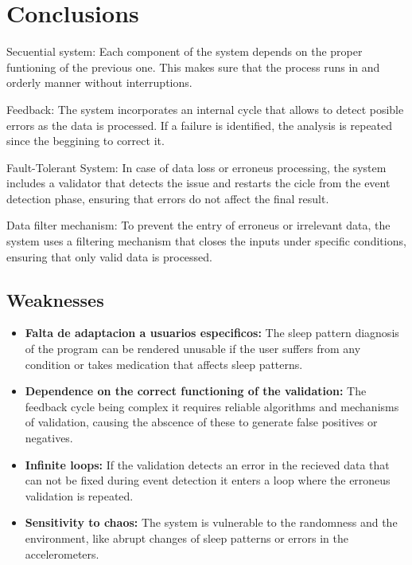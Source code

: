 \documentclass[conference]{IEEEtran}
\begin{document}
\section{Conclusions}

Secuential system:
Each component of the system depends on the proper funtioning of the previous one. This makes sure that the process runs in and orderly manner without interruptions.

Feedback:
The system incorporates an internal cycle that allows to detect posible errors as the data is processed. If a failure is identified, the analysis is repeated since the beggining to correct it.

Fault-Tolerant System:
In case of data loss or erroneus processing, the system includes a validator that detects the issue and restarts the cicle from the event detection phase, ensuring that errors do not affect the final result.

Data filter mechanism:
To prevent the entry of erroneus or irrelevant data, the system uses a filtering mechanism that closes the inputs under specific conditions, ensuring that only valid data is processed.

\subsection{Weaknesses}

\begin{itemize}
    \item \textbf{Falta de adaptacion a usuarios especificos:} The sleep pattern diagnosis of the program can be rendered unusable if the user suffers from any condition or takes medication that affects sleep patterns.
    \item \textbf{Dependence on the correct functioning of the validation:} The feedback cycle being complex it requires reliable algorithms and mechanisms of validation, causing the abscence of these to generate false positives or negatives.  
    \item \textbf{Infinite loops:} If the validation detects an error in the recieved data that can not be fixed during event detection it enters a loop where the erroneus validation is repeated.
    \item \textbf{Sensitivity to chaos:} The system is vulnerable to the randomness and the environment, like abrupt changes of sleep patterns or errors in the accelerometers. 
\end{itemize}
\end{document}

